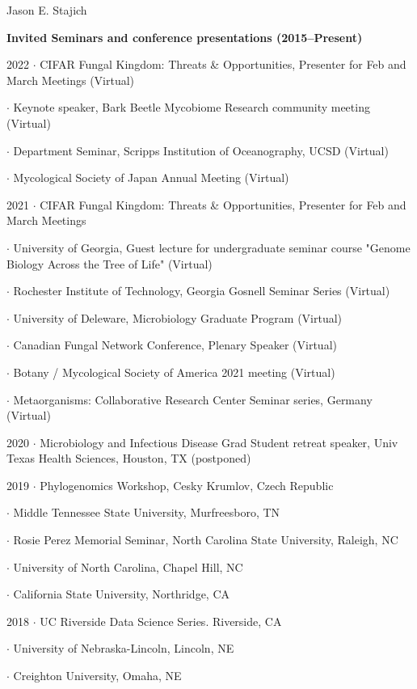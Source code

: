 \documentclass[10pt]{article}
\begin{document}
\begin{cv}{\centerline{Jason E. Stajich}}
\setlength{\cvlabelwidth}{8mm}
\begin{cvlistcompact}{\bf Invited Seminars and conference presentations (2015--Present)}
\item [2022] $\cdot$ CIFAR Fungal Kingdom: Threats \& Opportunities, Presenter for Feb and March Meetings (Virtual)
\item $\cdot$ Keynote speaker, Bark Beetle Mycobiome Research community meeting (Virtual)
\item $\cdot$ Department Seminar, Scripps Institution of Oceanography, UCSD (Virtual)
\item $\cdot$ Mycological Society of Japan Annual Meeting (Virtual)
\item [2021] $\cdot$ CIFAR Fungal Kingdom: Threats \& Opportunities, Presenter for Feb and March Meetings
\item $\cdot$ University of Georgia, Guest lecture for undergraduate seminar course "Genome Biology Across the Tree of Life" (Virtual)
\item $\cdot$ Rochester Institute of Technology, Georgia Gosnell Seminar Series (Virtual)
\item $\cdot$ University of Deleware, Microbiology Graduate Program (Virtual)
\item $\cdot$ Canadian Fungal Network Conference, Plenary Speaker (Virtual)
\item $\cdot$ Botany / Mycological Society of America 2021 meeting (Virtual)
\item $\cdot$ Metaorganisms: Collaborative Research Center Seminar series, Germany (Virtual)
\item [2020] $\cdot$ Microbiology and Infectious Disease Grad Student retreat speaker, Univ Texas Health Sciences, Houston, TX (postponed)
\item [2019] $\cdot$ Phylogenomics Workshop, Cesky Krumlov, Czech Republic
\item $\cdot$ Middle Tennessee State University, Murfreesboro, TN
\item $\cdot$ Rosie Perez Memorial Seminar, North Carolina State University, Raleigh, NC
\item $\cdot$ University of North Carolina, Chapel Hill, NC
\item $\cdot$ California State University, Northridge, CA
\item [2018] $\cdot$ UC Riverside Data Science Series. Riverside, CA
\item $\cdot$ University of Nebraska-Lincoln, Lincoln, NE
\item $\cdot$ Creighton University, Omaha, NE

\end{cvlistcompact}
\end{cv}
\end{document}
